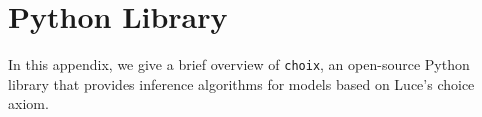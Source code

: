 \chapter{Python Library}

In this appendix, we give a brief overview of \texttt{choix}, an open-source Python library that provides inference algorithms for models based on Luce's choice axiom.
